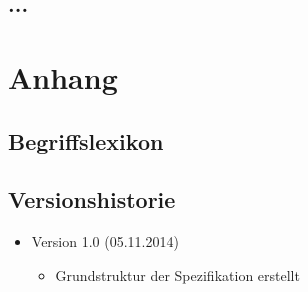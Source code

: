 \documentclass[11pt]{article}
\begin{document}
\subsection{...}

\section{Anhang}

\subsection{Begriffslexikon}

\subsection{Versionshistorie}

\begin{itemize}
	\item Version 1.0 (05.11.2014)
	\begin{itemize}
		\item Grundstruktur der Spezifikation erstellt
	\end{itemize}
\end{itemize}
\end{document}

